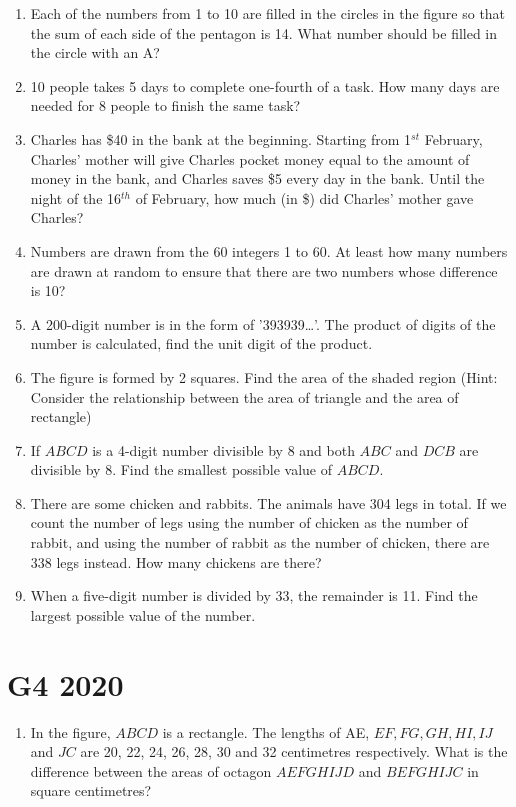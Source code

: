 \documentclass[11pt]{scrartcl}
\begin{document}
\begin{enumerate}
    \item Each of the numbers from 1 to 10 are filled in the circles in the figure so that the sum of each side of the pentagon is 14. What number should be filled in the circle with an A?
    
    \item 10 people takes 5 days to complete one-fourth of a task. How many days are needed for 8 people to finish the same task?
    
    \item Charles has \$40 in the bank at the beginning. Starting from 1$^{st}$ February, Charles' mother will give Charles pocket money equal to the amount of money in the bank, and Charles saves \$5 every day in the bank. Until the night of the 16$^{th}$ of February, how much (in \$) did Charles' mother gave Charles?
    
    \item Numbers are drawn from the 60 integers 1 to 60. At least how many numbers are drawn at random to ensure that there are two numbers whose difference is 10?
    
    \item A 200-digit number is in the form of '393939\ldots'. The product of digits of the number is calculated, find the unit digit of the product.
    
    \item The figure is formed by 2 squares. Find the area of the shaded region (Hint: Consider the relationship between the area of triangle and the area of rectangle)
    
    \item If $ABCD$ is a 4-digit number divisible by 8 and both $ABC$ and $DCB$ are divisible by 8. Find the smallest possible value of $ABCD$.
    
    \item There are some chicken and rabbits. The animals have 304 legs in total. If we count the number of legs using the number of chicken as the number of rabbit, and using the number of rabbit as the number of chicken, there are 338 legs instead. How many chickens are there?
    
    \item When a five-digit number is divided by 33, the remainder is 11. Find the largest possible value of the number.
\end{enumerate}

\section{G4 2020}
\begin{enumerate}
    \item In the figure, $ABCD$ is a rectangle. The lengths of AE, $EF, FG, GH, HI, IJ$ and $JC$ are 20, 22, 24, 26, 28, 30 and 32 centimetres respectively. What is the difference between the areas of octagon $AEFGHIJD$ and $BEFGHIJC$ in square centimetres?
\end{enumerate}
\end{document}
